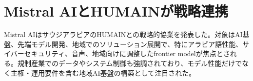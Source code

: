 \section{Mistral AIとHUMAINが戦略連携}
Mistral AIはサウジアラビアのHUMAINとの戦略的協業を発表した。対象はAI基盤、先端モデル開発、地域でのソリューション展開で、特にアラビア語性能、サイバーセキュリティ、音声、地域向けに調整したfrontier modelが焦点とされる。規制産業でのデータやシステム制御も強調されており、モデル性能だけでなく主権・運用要件を含む地域AI基盤の構築として注目された。
